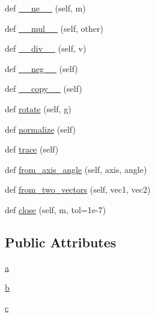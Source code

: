 \begin{DoxyCompactItemize}
\item 
def \mbox{\hyperlink{classpymavlink_1_1rotmat_1_1Matrix3_af0dd6907c51e35d254b7e78b3ab153f2}{\+\_\+\+\_\+ne\+\_\+\+\_\+}} (self, m)
\item 
def \mbox{\hyperlink{classpymavlink_1_1rotmat_1_1Matrix3_a1ef3cbd6ff8b2a5552ab1815368bea73}{\+\_\+\+\_\+mul\+\_\+\+\_\+}} (self, other)
\item 
def \mbox{\hyperlink{classpymavlink_1_1rotmat_1_1Matrix3_a33b7d26f77f11815be897f21a2f846be}{\+\_\+\+\_\+div\+\_\+\+\_\+}} (self, v)
\item 
def \mbox{\hyperlink{classpymavlink_1_1rotmat_1_1Matrix3_a52ca10cafc20362cc59aa47dec8733e8}{\+\_\+\+\_\+neg\+\_\+\+\_\+}} (self)
\item 
def \mbox{\hyperlink{classpymavlink_1_1rotmat_1_1Matrix3_aaab43e8d595d0c4422b5561db2a0b89f}{\+\_\+\+\_\+copy\+\_\+\+\_\+}} (self)
\item 
def \mbox{\hyperlink{classpymavlink_1_1rotmat_1_1Matrix3_a68eaac6b40df4fda8589403cfb1c6f47}{rotate}} (self, g)
\item 
def \mbox{\hyperlink{classpymavlink_1_1rotmat_1_1Matrix3_a8dcef0074eff59c72566574f380a8487}{normalize}} (self)
\item 
def \mbox{\hyperlink{classpymavlink_1_1rotmat_1_1Matrix3_ac10cb8963613b9febb43869cd22c58cf}{trace}} (self)
\item 
def \mbox{\hyperlink{classpymavlink_1_1rotmat_1_1Matrix3_a65a0956b9e01314396316e247ae56ed8}{from\+\_\+axis\+\_\+angle}} (self, axis, angle)
\item 
def \mbox{\hyperlink{classpymavlink_1_1rotmat_1_1Matrix3_a2c4686d62f2d2bf82c4bbcce63e341f0}{from\+\_\+two\+\_\+vectors}} (self, vec1, vec2)
\item 
def \mbox{\hyperlink{classpymavlink_1_1rotmat_1_1Matrix3_a16559bd4505650c03021ace738bb40f8}{close}} (self, m, tol=1e-\/7)
\end{DoxyCompactItemize}
\subsection*{Public Attributes}
\begin{DoxyCompactItemize}
\item 
\mbox{\hyperlink{classpymavlink_1_1rotmat_1_1Matrix3_a6e59a3b14add2220f8a218e12d631464}{a}}
\item 
\mbox{\hyperlink{classpymavlink_1_1rotmat_1_1Matrix3_a4bb23872122a20e4b5a6de2e2a327a2f}{b}}
\item 
\mbox{\hyperlink{classpymavlink_1_1rotmat_1_1Matrix3_aaad9f3e5cf235b0922738d71dc08e6b7}{c}}
\end{DoxyCompactItemize}
